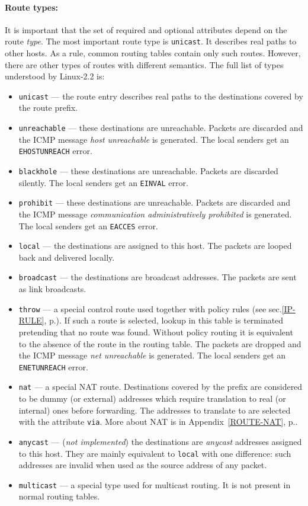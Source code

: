 \paragraph{Route types:} \label{IP-ROUTE-TYPES}
It is important that the set
of required and optional attributes depend on the route {\em type\/}.
The most important route type
is \verb|unicast|. It describes real paths to other hosts.
As a rule, common routing tables contain only such routes. However,
there are other types of routes with different semantics. The
full list of types understood by Linux-2.2 is:
\begin{itemize}
\item \verb|unicast| --- the route entry describes real paths to the
destinations covered by the route prefix.
\item \verb|unreachable| --- these destinations are unreachable. Packets
are discarded and the ICMP message {\em host unreachable\/} is generated.
The local senders get an \verb|EHOSTUNREACH| error.
\item \verb|blackhole| --- these destinations are unreachable. Packets
are discarded silently. The local senders get an \verb|EINVAL| error.
\item \verb|prohibit| --- these destinations are unreachable. Packets
are discarded and the ICMP message {\em communication administratively
prohibited\/} is generated. The local senders get an \verb|EACCES| error.
\item \verb|local| --- the destinations are assigned to this
host. The packets are looped back and delivered locally.
\item \verb|broadcast| --- the destinations are broadcast addresses.
The packets are sent as link broadcasts.
\item \verb|throw| --- a special control route used together with policy
rules (see sec.\ref{IP-RULE}, p.\pageref{IP-RULE}). If such a route is selected, lookup
in this table is terminated pretending that no route was found.
Without policy routing it is equivalent to the absence of the route in the routing
table. The packets are dropped and the ICMP message {\em net unreachable\/}
is generated. The local senders get an \verb|ENETUNREACH| error.
\item \verb|nat| --- a special NAT route. Destinations covered by the prefix
are considered to be dummy (or external) addresses which require translation
to real (or internal) ones before forwarding. The addresses to translate to
are selected with the attribute \verb|via|. More about NAT is
in Appendix~\ref{ROUTE-NAT}, p.\pageref{ROUTE-NAT}.
\item \verb|anycast| --- ({\em not implemented\/}) the destinations are
{\em anycast\/} addresses assigned to this host. They are mainly equivalent
to \verb|local| with one difference: such addresses are invalid when used
as the source address of any packet.
\item \verb|multicast| --- a special type used for multicast routing.
It is not present in normal routing tables.
\end{itemize}


